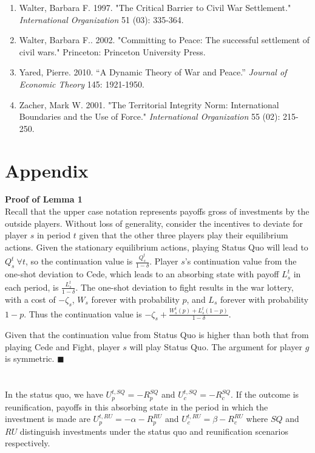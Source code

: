 \documentclass[11pt,letterpaper, notitlepage]{article}
\begin{document}
\begin{enumerate}[1.]
\item \hangindent=1cm Walter, Barbara F. 1997. "The Critical Barrier to Civil War Settlement." \emph {International Organization} 51 (03): 335-364.

\item \hangindent=1cm Walter, Barbara F.. 2002. "Committing to Peace: The successful settlement of civil wars." Princeton: Princeton University Press.


\item \hangindent=1cm Yared, Pierre. 2010. ``A Dynamic Theory of War and Peace.'' \emph{Journal of Economic Theory} 145: 1921-1950.

\item \hangindent=1cm Zacher, Mark W. 2001. "The Territorial Integrity Norm: International Boundaries and the Use of Force." \emph {International Organization} 55 (02): 215-250.

\end{enumerate}


\pagebreak
\appendix
\section{Appendix} 

{\bf Proof of Lemma 1} \\
Recall that the upper case notation represents payoffs gross of investments by the outside players. Without loss of generality, consider the incentives to deviate for player $s$ in period $t$ given that the other three players play their equilibrium actions. Given the stationary equilibrium actions, playing Status Quo will lead to $Q_s^t \ \forall t$, so the continuation value is $\frac{Q_s^t}{1-\delta}$. Player $s$'s continuation value from the one-shot deviation to Cede, which leads to an absorbing state with payoff $L_s^t$ in each period, is $\frac{L_s^t}{1-\delta}$. The one-shot deviation to fight results in the war lottery, with a cost of $-\zeta_s$, $W_s$ forever with probability $p$, and $L_s$ forever with probability $1-p$. Thus the continuation value is $-\zeta_s +\frac{W_s^t(p)+ L_s^t(1-p)}{1-\delta}$.

Given that the continuation value from Status Quo is higher than both that from playing Cede and Fight, player $s$ will play Status Quo. The argument for player $g$ is symmetric. \hfill $\blacksquare$
\\
\\
 \\
In the status quo, we have $U_p^{t,SQ}= -R_p^{SQ}$ and $U_c^{t,SQ}= -R_c^{SQ}$. If the outcome is reunification, payoffs in this absorbing state in the period in which the investment is made are $U_p^{t,RU}= -\alpha -R_p^{RU}$ and $U_c^{t,RU}= \beta -R_c^{RU}$ where $SQ$ and $RU$ distinguish investments under the status quo and reunification scenarios respectively.
\end{document}
